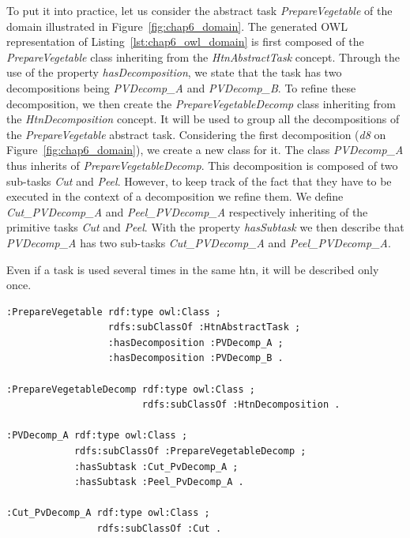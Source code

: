 To put it into practice, let us consider the abstract task \textit{PrepareVegetable} of the domain illustrated in Figure~\ref{fig:chap6_domain}. The generated OWL representation of Listing~\ref{lst:chap6_owl_domain} is first composed of the \textit{PrepareVegetable} class inheriting from the \textit{HtnAbstractTask} concept. Through the use of the property \textit{hasDecomposition}, we state that the task has two decompositions being \textit{PVDecomp\_A} and \textit{PVDecomp\_B}. To refine these decomposition, we then create the \textit{PrepareVegetableDecomp} class inheriting from the \textit{HtnDecomposition} concept. It will be used to group all the decompositions of the \textit{PrepareVegetable} abstract task. Considering the first decomposition (\textit{d8} on Figure~\ref{fig:chap6_domain}), we create a new class for it. The class \textit{PVDecomp\_A} thus inherits of \textit{PrepareVegetableDecomp}. This decomposition is composed of two sub-tasks \textit{Cut} and \textit{Peel}. However, to keep track of the fact that they have to be executed in the context of a decomposition we refine them. We define \textit{Cut\_PVDecomp\_A} and \textit{Peel\_PVDecomp\_A} respectively inheriting of the primitive tasks \textit{Cut} and \textit{Peel}. With the property \textit{hasSubtask} we then describe that \textit{PVDecomp\_A} has two sub-tasks \textit{Cut\_PVDecomp\_A} and \textit{Peel\_PVDecomp\_A}.

Even if a task is used several times in the same \acrshort{htn}, it will be described only once.

\begin{lstlisting}[frame=single, basicstyle=\scriptsize\ttfamily, label={lst:chap6_owl_domain}, caption={Description of the abstract task PrepareVegetable and one of its decomposition in the OWL language using the Turle syntax.},captionpos=b, style=OwlTurtle]
:PrepareVegetable rdf:type owl:Class ;
                  rdfs:subClassOf :HtnAbstractTask ;
                  :hasDecomposition :PVDecomp_A ;
                  :hasDecomposition :PVDecomp_B .

:PrepareVegetableDecomp rdf:type owl:Class ;
                        rdfs:subClassOf :HtnDecomposition .

:PVDecomp_A rdf:type owl:Class ;
            rdfs:subClassOf :PrepareVegetableDecomp ;
            :hasSubtask :Cut_PvDecomp_A ;
            :hasSubtask :Peel_PvDecomp_A .

:Cut_PvDecomp_A rdf:type owl:Class ;
                rdfs:subClassOf :Cut .
\end{lstlisting}

